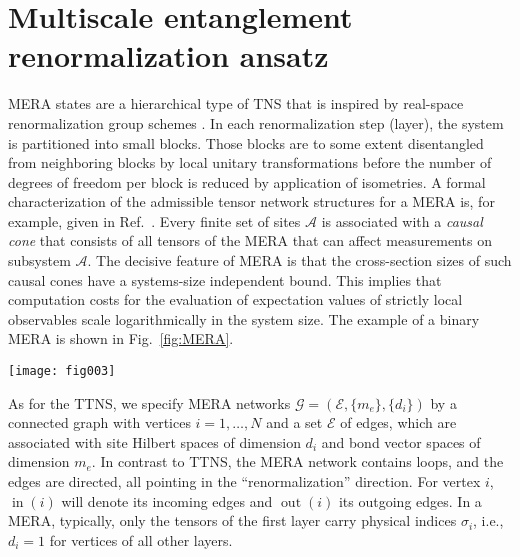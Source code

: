 \documentclass[english,11pt,aps,pra,onecolumn,tightenlines,groupedaddress,superscriptaddress,notitlepage,floatfix,fleqn]{revtex4-1}
\newcommand{\s}{\sigma}
\newcommand{\mc}[1]{\mathcal{#1}}
\newcommand{\A}{\mc{A}}
\newcommand{\E}{\mc{E}}
\newcommand{\G}{\mc{G}}
\newcommand{\In}{\operatorname{in}}
\newcommand{\Out}{\operatorname{out}}
\begin{document}
\section{Multiscale entanglement renormalization ansatz}\label{sec:MERA}
MERA states \cite{Vidal-2005-12,Vidal2006} are a hierarchical type of TNS that is inspired by real-space renormalization group schemes \cite{Kadanoff1966-2,Jullien1977-38,Drell1977-16}. In each renormalization step (layer), the system is partitioned into small blocks. Those blocks are to some extent disentangled from neighboring blocks by local unitary transformations before the number of degrees of freedom per block is reduced by application of isometries. A formal characterization of the admissible tensor network structures for a MERA is, for example, given in Ref.~\cite{Barthel2010-105}. Every finite set of sites $\A$ is associated with a \emph{causal cone} that consists of all tensors of the MERA that can affect measurements on subsystem $\A$. The decisive feature of MERA is that the cross-section sizes of such causal cones have a systems-size independent bound. This implies that computation costs for the evaluation of expectation values of strictly local observables scale logarithmically in the system size.
The example of a binary MERA is shown in Fig.~\ref{fig:MERA}.
\begin{figure*}[t]
\label{fig:MERA}
\texttt{[image: fig003]}
\caption{(a) A so-called binary MERA for a one-dimensional system with $L$ sites consists of $\log_2 L$ layers. Each layer contains unitary gates that disentangle nearby degrees of freedom before they are decimated by a factor of two. The so-called causal cone of sites 5 and 6 is indicated by the shaded region. (b) All tensors are isometric; cf.\ Eq.~\eqref{eq:MERA-iso}.}
\end{figure*}

As for the TTNS, we specify MERA networks $\G=(\E,\{m_e\},\{d_i\})$ by a connected graph with vertices $i=1,\dots,N$ and a set $\E$ of edges, which are associated with site Hilbert spaces of dimension $d_i$ and bond vector spaces of dimension $m_e$. In contrast to TTNS, the MERA network contains loops, and the edges are directed, all pointing in the ``renormalization'' direction. For vertex $i$, $\In(i)$ will denote its incoming edges and $\Out(i)$ its outgoing edges. In a MERA, typically, only the tensors of the first layer carry physical indices $\s_i$, i.e., $d_i=1$ for vertices of all other layers.
\end{document}
